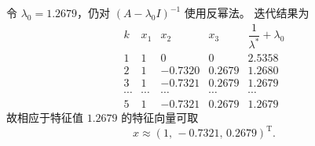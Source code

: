 \documentclass[11pt, a4paper]{ctexart}
\begin{document}
\begin{solution}
    令 $\lambda_0=1.2679$，仍对 $(A-\lambda_0 I)^{-1}$ 使用反幂法。
    迭代结果为
    \[
        \renewcommand{\arraystretch}{1.15}
        \begin{array}{c|rrrr}
            k & x_1 & x_2 & x_3 & \dfrac{1}{\lambda^\ast}+\lambda_0 \\ \hline
            1 & 1 & 0 & 0 & 2.5358 \\
            2 & 1 & -0.7320 & 0.2679 & 1.2680 \\
            3 & 1 & -0.7321 & 0.2679 & 1.2679 \\
            \cdots & \cdots & \cdots & \cdots & \cdots \\
            5 & 1 & -0.7321 & 0.2679 & 1.2679
        \end{array}
    \]
    故相应于特征值 $1.2679$ 的特征向量可取
    \[
        x \approx (1,\,-0.7321,\,0.2679)^{\mathrm{T}}.
    \]
\end{solution}
\end{document}
